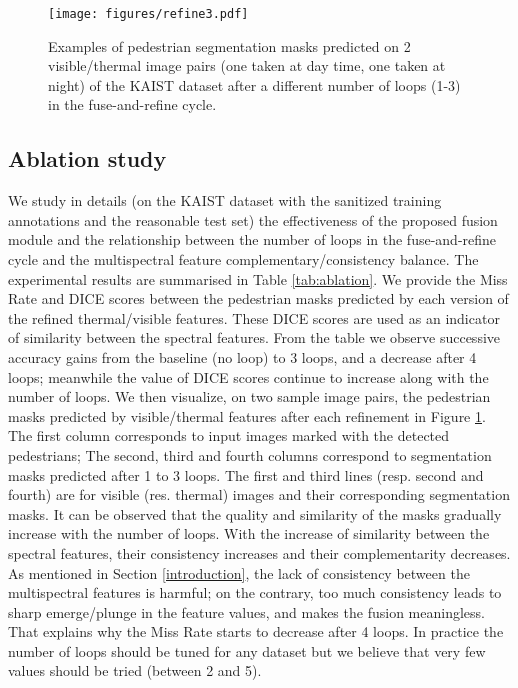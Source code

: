 \documentclass{article}
\begin{document}
\begin{figure}[]
\centering
\texttt{[image: figures/refine3.pdf]}
\caption{Examples of pedestrian segmentation masks predicted on 2 visible/thermal image pairs (one taken at day time, one taken at night) of the KAIST dataset after a different number of loops (1-3) in the fuse-and-refine cycle.}
\label{fig:refine3}
\end{figure}

\subsection{Ablation study}
\label{abstudy}
We study in details (on the KAIST dataset with the sanitized training annotations and the reasonable test set) the effectiveness of the proposed fusion module and the relationship between the number of loops in the fuse-and-refine cycle and the multispectral feature complementary/consistency balance.
The experimental results are summarised in Table \ref{tab:ablation}. We provide the Miss Rate and DICE scores \cite{DICE} between the pedestrian masks predicted by each version of the refined thermal/visible features. These DICE scores are used as an indicator of similarity between the spectral features.
From the table we observe successive accuracy gains from the baseline (no loop) to 3 loops, and a decrease after 4 loops; meanwhile the value of DICE scores continue to increase along with the number of loops.
We then visualize, on two sample image pairs, the pedestrian masks predicted by visible/thermal features after each refinement in Figure \ref{fig:refine3}. The first column corresponds to input images marked with the detected pedestrians; The second, third and fourth columns correspond to segmentation masks predicted after 1 to 3 loops. The first and third lines (resp. second and fourth) are for visible (res. thermal) images and their corresponding segmentation masks. It can be observed that the quality and similarity of the masks gradually increase with the number of loops. With the increase of similarity between the spectral features, their consistency increases and their complementarity decreases. As mentioned in Section \ref{introduction}, the lack of consistency between the multispectral features is harmful; on the contrary, too much consistency leads to sharp emerge/plunge in the feature values, and makes the fusion meaningless. That explains why the Miss Rate starts to decrease after 4 loops. In practice the number of loops should be tuned for any dataset but we believe that very few values should be tried (between 2 and 5). 
\end{document}
